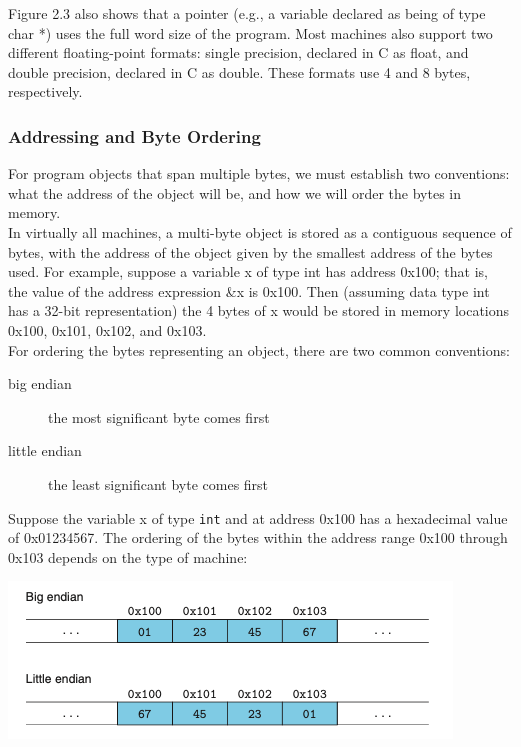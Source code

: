 \documentclass[11pt]{article}
\begin{document}
Figure 2.3 also shows that a pointer (e.g., a variable declared as being of type char *) uses the full word size of the program. Most machines also support two different floating-point formats: single precision, declared in C as float, and double precision, declared in C as double. These formats use 4 and 8 bytes, respectively.\\



\subsubsection{Addressing and Byte Ordering}
\label{sec:org6711e9a}

For program objects that span multiple bytes, we must establish two conventions: what the address of the object will be, and how we will order the bytes in memory.\\

In virtually all machines, a multi-byte object is stored as a contiguous sequence of bytes, with the address of the object given by the smallest address of the bytes used. For example, suppose a variable x of type int has address 0x100; that is, the value of the address expression \&x is 0x100. Then (assuming data type int has a 32-bit representation) the 4 bytes of x would be stored in memory locations 0x100, 0x101, 0x102, and 0x103.\\

For ordering the bytes representing an object, there are two common conventions:\\
\begin{description}
\item[{big endian}] the most significant byte comes first\\
\item[{little endian}] the least significant byte comes first\\
\end{description}

Suppose the variable x of type \texttt{int} and at address 0x100 has a hexadecimal value of 0x01234567. The ordering of the bytes within the address range 0x100 through 0x103 depends on the type of machine:\\

\begin{center}
\includegraphics[width=.9\linewidth]{pics/ordering-convention.png}
\end{center}
\end{document}
